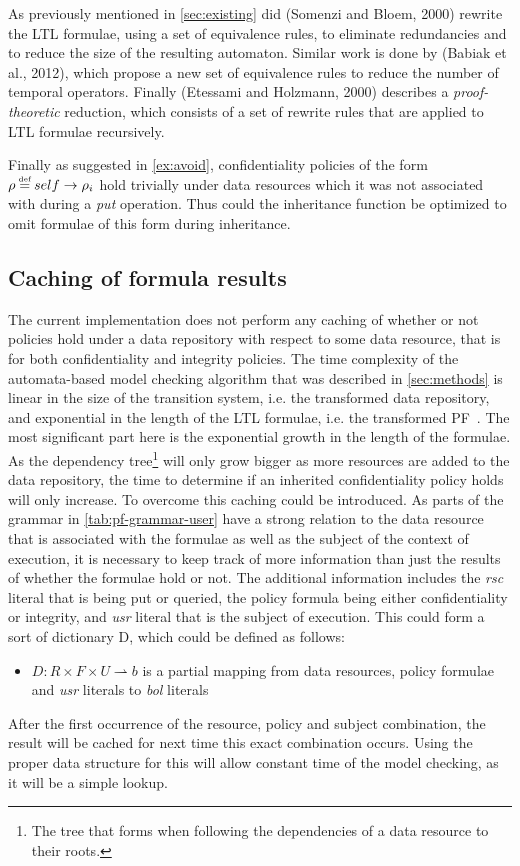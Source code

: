 As previously mentioned in \autoref{sec:existing} did (Somenzi and Bloem, 2000)\cite{somenzi2000efficient} rewrite the LTL formulae, using a set of equivalence rules, to eliminate redundancies and to reduce the size of the resulting automaton. Similar work is done by (Babiak et al., 2012)\cite{babiak2012ltl}, which propose a new set of equivalence rules to reduce the number of temporal operators. Finally (Etessami and Holzmann, 2000)\cite{etessami2000optimizing} describes a \emph{proof-theoretic} reduction, which consists of a set of rewrite rules that are applied to LTL formulae recursively.

Finally as suggested in \autoref{ex:avoid}, confidentiality policies of the form $\conf \eqdef self \imply \conf_i$ hold trivially under data resources which it was not associated with during a \emph{put} operation. Thus could the inheritance function be optimized to omit formulae of this form during inheritance.

\subsection{Caching of formula results}\label{sec:cache}
The current implementation does not perform any caching of whether or not policies hold under a data repository with respect to some data resource, that is for both confidentiality and integrity policies. The time complexity of the automata-based model checking algorithm that was described in \autoref{sec:methods} is linear in the size of the transition system, i.e. the transformed data repository, and exponential in the length of the LTL formulae, i.e. the transformed PF~\cite{baier2008principles}. The most significant part here is the exponential growth in the length of the formulae. As the dependency tree\footnote{The tree that forms when following the dependencies of a data resource to their roots.} will only grow bigger as more resources are added to the data repository, the time to determine if an inherited confidentiality policy holds will only increase. To overcome this caching could be introduced. As parts of the grammar in \autoref{tab:pf-grammar-user} have a strong relation to the data resource that is associated with the formulae as well as the subject of the context of execution, it is necessary to keep track of more information than just the results of whether the formulae hold or not. The additional information includes the \emph{rsc} literal that is being put or queried, the policy formula being either confidentiality or integrity, and \emph{usr} literal that is the subject of execution. This could form a sort of dictionary D, which could be defined as follows:
\begin{itemize}
    \item $D : R \times F \times U \rightharpoonup b$ is a partial mapping from data resources, policy formulae and \emph{usr} literals to \emph{bol} literals
\end{itemize}
After the first occurrence of the resource, policy and subject combination, the result will be cached for next time this exact combination occurs. Using the proper data structure for this will allow constant time of the model checking, as it will be a simple lookup.